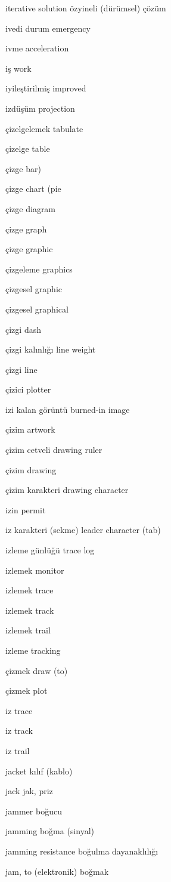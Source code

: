 \documentclass[12pt,fleqn]{article}\usepackage{../../common}
\begin{document}
iterative solution özyineli (dürümsel) çözüm

ivedi durum emergency

ivme acceleration

iş work

iyileştirilmiş improved

izdüşüm projection

çizelgelemek tabulate

çizelge table

çizge bar)

çizge chart (pie

çizge diagram

çizge graph

çizge graphic

çizgeleme graphics

çizgesel graphic

çizgesel graphical

çizgi dash

çizgi kalınlığı line weight

çizgi line

çizici plotter

izi kalan görüntü burned-in image

çizim artwork

çizim cetveli drawing ruler

çizim drawing

çizim karakteri drawing character

izin permit

iz karakteri (sekme) leader character (tab)

izleme günlüğü trace log

izlemek monitor

izlemek trace

izlemek track

izlemek trail

izleme tracking

çizmek draw (to)

çizmek plot

iz trace

iz track

iz trail

jacket kılıf (kablo)

jack jak, priz

jammer boğucu

jamming boğma (sinyal)

jamming resistance boğulma dayanaklılığı

jam, to (elektronik) boğmak
\end{document}
